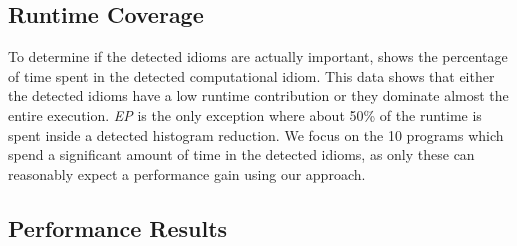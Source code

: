 \subsection{Runtime Coverage}

    To determine if the detected idioms are actually important,
     shows the percentage of time spent in the detected
    computational idiom.
    This data shows that either the detected idioms have a low runtime
    contribution or they dominate almost the entire execution.
    \emph{EP} is the only exception where about 50\% of the runtime is spent
    inside a detected histogram reduction.
    We focus on the 10 programs which spend a significant amount of time in the
    detected idioms, as only these can reasonably expect a performance gain
    using our approach.

\subsection{Performance Results}

